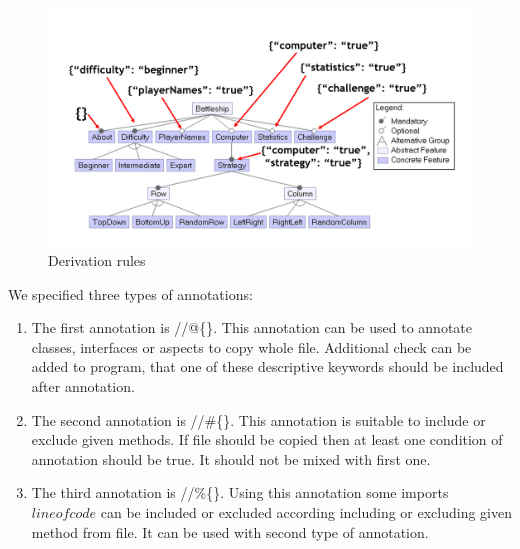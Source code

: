 \documentclass[11pt,english,a4paper,twoside]{article}
\begin{document}
\begin{figure}[H]  %
					\begin{center}
									\includegraphics[width=\linewidth]{fig/derivationRules.png}
									\caption{Derivation rules}
									\label{derivationRules}
					\end{center}
\end{figure}


We specified three types of annotations:

\begin{enumerate}
	\item The first annotation is //@\{\}. This annotation can be used to annotate classes, interfaces or aspects to copy whole file. Additional check can be added to program, that one of these descriptive keywords should be included after annotation.

	\item The second annotation is //\#\{\}. This annotation is suitable to include or exclude given methods. If file should be copied then at least one condition of annotation should be true. It should not be mixed with first one. 

	\item The third annotation is //\%\{\}. Using this annotation some imports \(line of code\) can be included or excluded according including or excluding given method from file. It can be used with second type of annotation. 
\end{enumerate}
\end{document}
